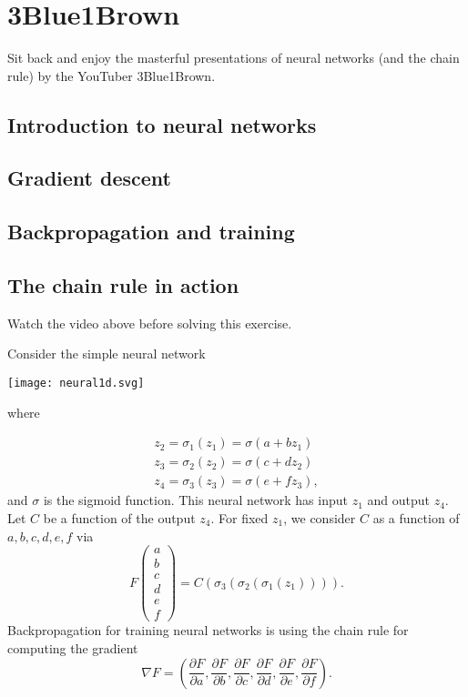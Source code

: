 \documentclass{article}
\newcommand{\pd}[2]{\frac{\partial #1}{\partial #2}}
\begin{document}
\endshex


\section{3Blue1Brown}

Sit back and enjoy the masterful presentations of neural networks (and
the chain rule) by the YouTuber 3Blue1Brown.

\subsection{Introduction to neural networks}


\subsection{Gradient descent}


\subsection{Backpropagation and training}


\subsection{The chain rule in action}


\newcommand{\pd}[2]{\dfrac{\partial #1}{\partial #2}}


\beginshex
Watch the video above before solving this exercise.

Consider the simple neural network

\texttt{[image: neural1d.svg]}

where

\begin{align*}
  z_2 = \sigma_1(z_1) = \sigma(a + b z_1)\\
  z_3 = \sigma_2(z_2) = \sigma(c + d z_2)\\
  z_4 = \sigma_3(z_3) = \sigma(e + f z_3),
\end{align*}
and $\sigma$ is the sigmoid function. This neural network has input $z_1$ 
and output $z_4$. Let $C$ be a function of the output $z_4$. For fixed
$z_1$, we consider $C$ as a function of $a, b, c, d, e, f$ via
$$
F\begin{pmatrix} a\\ b\\ c\\ d\\ e\\ f\end{pmatrix} =
C(\sigma_3(\sigma_2(\sigma_1(z_1)))).
$$
Backpropagation for training neural networks is using the
chain rule for computing the gradient
$$
\nabla F = \left( \pd{F}{a}, \pd{F}{b}, \pd{F}{c}, \pd{F}{d}, \pd{F}{e}, \pd{F}{f} \right).
$$
\end{document}
